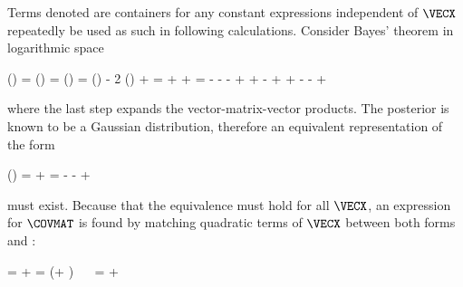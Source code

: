    Terms denoted  are containers for any constant expressions
    independent of $\VECX$ repeatedly be used as such in following
    calculations. Consider Bayes' theorem in logarithmic space

    \placesubformula
    \startformula
    \startalign[n=2,align={right,left}]
         \ln(\POSTERIOR) =  \ln\left(\frac{\JOINT}{\NORMALIZATION}\right) \NR
        \NC =  \ln\left(\frac{\LIKELIHOOD \PRIOR}{\NORMALIZATION}\right) \NR
        \NC =  \ln(\LIKELIHOOD) - 2 \ln(\PRIOR) + \CONST \NR
        \NC = \NC \GAUSSEXP{\VECY}{\MATB \VECX - \VECB}{\MATQ}
            + \GAUSSEXP{\VECX}{\VECA}{\MATP} + \CONST\NR
        \NC = \NC
            \VECYT \MATQ \VECY
            - \VECYT \MATQ \MATB \VECX
            - \VECYT \MATQ \VECB
            - \VECXT \MATBT \MATQ \VECY
            \NR
        \NC \NC
            + \VECXT \MATBT \MATQ \MATB \VECX
            + \VECXT \MATBT \MATQ \VECB
            - \VECBT \MATQ \VECY
            + \VECBT \MATQ \MATB \VECX
            \NR[eq:gaussprodexpand]
        \NC \NC
            + \VECXT \MATP \VECX
            - \VECXT \MATP \VECA
            - \VECAT \MATP \VECX
            + \CONST
            \NR
    \stopalign
    \stopformula

    where the last step expands the vector-matrix-vector products. The
    posterior is known to be a Gaussian distribution, therefore an equivalent
    representation of the form

    \placesubformula
    \startformula
    \startalign[n=2,align={right,left}]
         \ln(\POSTERIOR) = \NC
            \GAUSSEXP{\VECX}{\VECC}{\MATS} + \CONST \NR
        \NC = \NC
             \VECXT \MATS \VECX
             - \VECXT \MATS \VECC
             - \VECCT \MATS \VECX
             + \CONST \NR[eq:gausspostexpand]
    \stopalign
    \stopformula

    must exist. Because that the equivalence must hold for all $\VECX$, an
    expression for $\COVMAT$ is found by matching quadratic terms of $\VECX$
    between both forms  and :

    \startformula
    \startalign[n=3,align={left,right,left}]
        \NC \NC \VECXT \MATS \VECX = \NC
            \VECXT \MATBT \MATQ \MATB \VECX + \VECXT \MATP \VECX \NR
        \NC \NC = \NC
            \VECXT (\MATBT \MATQ \MATB + \MATP) \VECX \NR
        \NC \Rightarrow~~ \NC \MATS = \NC
            \MATBT \MATQ \MATB + \MATP
            \EQSTOP
    \stopalign
    \stopformula

